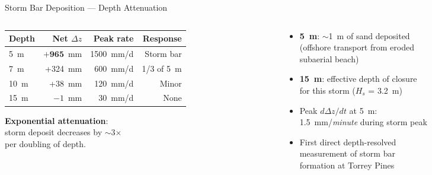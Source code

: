 \documentclass[10pt, aspectratio=169]{beamer}
\begin{document}
\begin{frame}{Storm Bar Deposition --- Depth Attenuation}
  \begin{columns}[T]
    \begin{column}{0.55\textwidth}
      \begin{table}\small
        \begin{tabular}{lrrr}
        \toprule
        Depth & Net $\Delta z$ & Peak rate & Response \\
        \midrule
        5~m & $\mathbf{+965}$~mm & 1500~mm/d & Storm bar \\
        7~m & +324~mm & 600~mm/d & 1/3 of 5~m \\
        10~m & +38~mm & 120~mm/d & Minor \\
        15~m & $-1$~mm & 30~mm/d & None \\
        \bottomrule
        \end{tabular}
      \end{table}
      \vspace{0.5em}
      \textbf{Exponential attenuation}:\\
      storm deposit decreases by $\sim$3$\times$\\
      per doubling of depth.
    \end{column}
    \begin{column}{0.42\textwidth}
      \begin{itemize}
        \item \textbf{5~m}: $\sim$1~m of sand deposited\\
              (offshore transport from eroded\\
              subaerial beach)
        \item \textbf{15~m}: effective depth of closure\\
              for this storm ($H_s$ = 3.2~m)
        \item Peak $d\Delta z/dt$ at 5~m:\\
              1.5~mm/\emph{minute} during storm peak
        \item First direct depth-resolved\\
              measurement of storm bar\\
              formation at Torrey Pines
      \end{itemize}
    \end{column}
  \end{columns}
\end{frame}

\end{document}
